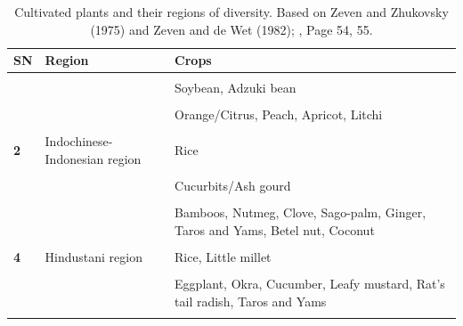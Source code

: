 \documentclass[
  ignorenonframetext,
  aspectratio=169]{beamer}
\begin{document}
\begin{frame}{}
\protect\hypertarget{section-12}{}
\begin{table}

\caption{\label{tab:diversity-region1}Cultivated plants and their regions of diversity. Based on Zeven and Zhukovsky (1975) and Zeven and de Wet (1982); \cite{hayward2012plant}, Page 54, 55.}
\centering
\fontsize{6}{8}\selectfont
\begin{tabular}[t]{>{\raggedright\arraybackslash}p{3em}>{\raggedright\arraybackslash}p{14em}>{\raggedright\arraybackslash}p{32em}}
\toprule
SN & Region & Crops\\
\midrule
\textbf{\cellcolor{gray!6}{1}} & \cellcolor{gray!6}{Chinese-Japanese region} & \cellcolor{gray!6}{Prosomillet, Foxtail millet, Naked oat}\\
\textbf{} &  & Soybean, Adzuki bean\\
\textbf{\cellcolor{gray!6}{}} & \cellcolor{gray!6}{} & \cellcolor{gray!6}{Leafy mustard}\\
\textbf{} &  & Orange/Citrus, Peach, Apricot, Litchi\\
\textbf{\cellcolor{gray!6}{}} & \cellcolor{gray!6}{} & \cellcolor{gray!6}{Bamboo, Ramie, Tung oil tree, Tea}\\
\addlinespace
\textbf{2} & Indochinese-Indonesian region & Rice\\
\textbf{\cellcolor{gray!6}{}} & \cellcolor{gray!6}{} & \cellcolor{gray!6}{Rice bean, Winged bean}\\
\textbf{} &  & Cucurbits/Ash gourd\\
\textbf{\cellcolor{gray!6}{}} & \cellcolor{gray!6}{} & \cellcolor{gray!6}{Mango, Banana, Rambutan, Durian, Bread fruit, Citrus/Lime, Grapefruit}\\
\textbf{} &  & Bamboos, Nutmeg, Clove, Sago-palm, Ginger, Taros and Yams, Betel nut, Coconut\\
\addlinespace
\textbf{\cellcolor{gray!6}{3}} & \cellcolor{gray!6}{Australian region} & \cellcolor{gray!6}{Eucalyptus, Acacia, Macadamia nut}\\
\textbf{4} & Hindustani region & Rice, Little millet\\
\textbf{\cellcolor{gray!6}{}} & \cellcolor{gray!6}{} & \cellcolor{gray!6}{Black gram, Green gram, Moth bean, Rice bean, Dolichos bean, Pigeonpea, Cowpea, Chickpea, Horsegram, Jute}\\
\textbf{} &  & Eggplant, Okra, Cucumber, Leafy mustard, Rat's tail radish, Taros and Yams\\
\textbf{\cellcolor{gray!6}{}} & \cellcolor{gray!6}{} & \cellcolor{gray!6}{Citrus, Banana, Mango, Sunhemp, Tree cotton}\\
\bottomrule
\end{tabular}
\end{table}
\end{frame}
\end{document}
